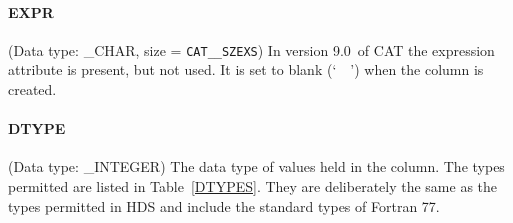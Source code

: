 \documentclass[11pt,twoside]{starlink}
\providecommand{\CATversion}{9.0~}
\begin{document}
\paragraph{EXPR}
(Data type: \_CHAR, size = \texttt{CAT\_\_SZEXS})
In version \CATversion of CAT the expression attribute is present, but
not used. It is set to blank (`~~') when the column is created.

\paragraph{DTYPE}
(Data type: \_INTEGER)
The data type of values held in the column. The types permitted are
listed in Table~\ref{DTYPES}. They are deliberately the same as the
types permitted in HDS and include the standard types of Fortran 77.
\end{document}
